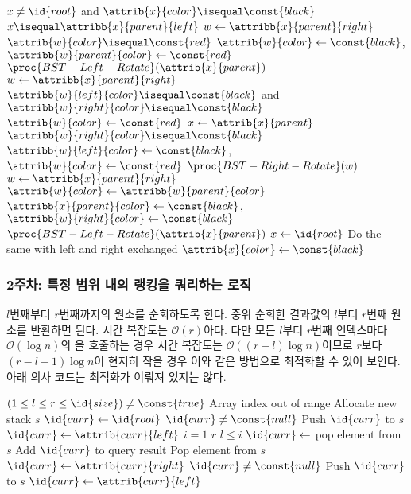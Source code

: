 \begin{codebox}
\li \While $x \neq \id{root}$ and $\attrib{x}{color} \isequal \const{black}$ \Do
\li     \If $x \isequal \attribb{x}{parent}{left}$ \Then
\li         $w \gets \attribb{x}{parent}{right}$
\li         \If $\attrib{w}{color} \isequal \const{red}$ \Then
\li             $\attrib{w}{color} \gets \const{black}$, $\attribb{w}{parent}{color} \gets \const{red}$
\li             $\proc{BST-Left-Rotate}(\attrib{x}{parent})$
\li             $w \gets \attribb{x}{parent}{right}$
            \End
\li         \If $\attribb{w}{left}{color} \isequal \const{black}$ and $\attribb{w}{right}{color} \isequal \const{black}$ \Then
\li             $\attrib{w}{color} \gets \const{red}$
\li             $x \gets \attrib{x}{parent}$
\li         \ElseNoIf
\li             \If $\attribb{w}{right}{color} \isequal \const{black}$ \Then
\li                 $\attribb{w}{left}{color} \gets \const{black}$, $\attrib{w}{color} \gets \const{red}$
\li                 $\proc{BST-Right-Rotate}(w)$
\li                 $w \gets \attribb{x}{parent}{right}$
                \End
\li             $\attrib{w}{color} \gets \attribb{w}{parent}{color}$
\li             $\attribb{x}{parent}{color} \gets \const{black}$, $\attribb{w}{right}{color} \gets \const{black}$
\li             $\proc{BST-Left-Rotate}(\attrib{x}{parent})$
\li             $x \gets \id{root}$
            \End
\li     \ElseNoIf
\li         Do the same with left and right exchanged
        \End
    \End
\li $\attrib{x}{color} \gets \const{black}$
\end{codebox}

\subsubsection{2주차: 특정 범위 내의 랭킹을 쿼리하는 로직} $l$번째부터 $r$번째까지의 원소를 순회하도록 한다. 중위 순회한 결과값의 $l$부터 $r$번째 원소를
반환하면 된다. 시간 복잡도는 $\mathcal{O}\left(r\right)$아다. 다만 모든 $l$부터 $r$번째 인덱스마다 $\mathcal{O}\left(\log n\right)$의
을 호출하는 경우 시간 복잡도는 $\mathcal{O}\left(\left(r - l\right) \log n\right)$이므로
$r$보다 $\left(r - l + 1\right) \log n$이 현저히 작을 경우 이와 같은 방법으로 최적화할 수 있어 보인다.
아래 의사 코드는 최적화가 이뤄져 있지는 않다.

\begin{codebox}
\li \If $(1 \leq l \leq r \leq \id{size}) \neq \const{true}$ \Then
\li     \Error Array index out of range
    \End
\li Allocate new stack $s$
\li $\id{curr} \gets \id{root}$
\li \While $\id{curr} \neq \const{null}$ \Do
\li     Push $\id{curr}$ to $s$
\li     $\id{curr} \gets \attrib{curr}{left}$
    \End
\li \For $i = 1$ \To $r$ \Do
\li     \If $l \leq i$ \Then
\li         $\id{curr} \gets $ pop element from $s$
\li         Add $\id{curr}$ to query result
\li     \ElseNoIf
\li         Pop element from $s$
        \End
\li     $\id{curr} \gets \attrib{curr}{right}$
\li     \While $\id{curr} \neq \const{null}$ \Do
\li         Push $\id{curr}$ to $s$
\li         $\id{curr} \gets \attrib{curr}{left}$
        \End
    \End
\end{codebox}

